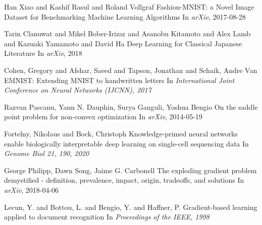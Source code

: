 \documentclass{article}
\begin{document}
\begin{thebibliography}{1}
Han Xiao and Kashif Rasul and Roland Vollgraf
\newblock Fashion-MNIST: a Novel Image Dataset for Benchmarking Machine Learning Algorithms
\newblock In {\em arXiv}, 2017-08-28

Tarin Clanuwat and Mikel Bober-Irizar and Asanobu Kitamoto and Alex Lamb and Kazuaki Yamamoto and David Ha
\newblock Deep Learning for Classical Japanese Literature
\newblock In {\em arXiv}, 2018

Cohen, Gregory and Afshar, Saeed and Tapson, Jonathan and Schaik, Andre Van
\newblock EMNIST: Extending MNIST to handwritten letters
\newblock In {\em International Joint Conference on Neural Networks (IJCNN), 2017}


Razvan Pascanu, Yann N. Dauphin, Surya Ganguli, Yoshua Bengio
\newblock On the saddle point problem for non-convex optimization
\newblock In {\em arXiv}, 2014-05-19

Fortelny, Nikolaus and Bock, Christoph
\newblock Knowledge-primed neural networks enable biologically interpretable deep learning on single-cell sequencing data
\newblock In {\em Genome Biol 21, 190, 2020}

George Philipp, Dawn Song, Jaime G. Carbonell
\newblock The exploding gradient problem demystified - definition, prevalence, impact, origin, tradeoffs, and solutions
\newblock In {\em arXiv}, 2018-04-06

Lecun, Y. and Bottou, L. and Bengio, Y. and Haffner, P.
\newblock Gradient-based learning applied to document recognition
\newblock In {\em Proceedings of the IEEE, 1998}

\end{thebibliography}
\end{document}
